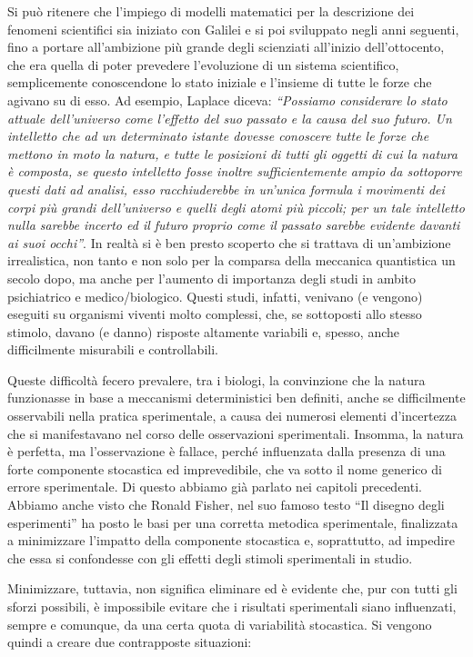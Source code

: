 \documentclass[
  12pt,
]{book}
\begin{document}
Si può ritenere che l'impiego di modelli matematici per la descrizione dei fenomeni scientifici sia iniziato con Galilei e si poi sviluppato negli anni seguenti, fino a portare all'ambizione più grande degli scienziati all'inizio dell'ottocento, che era quella di poter prevedere l'evoluzione di un sistema scientifico, semplicemente conoscendone lo stato iniziale e l'insieme di tutte le forze che agivano su di esso. Ad esempio, Laplace diceva: \emph{``Possiamo considerare lo stato attuale dell'universo come l'effetto del suo passato e la causa del suo futuro. Un intelletto che ad un determinato istante dovesse conoscere tutte le forze che mettono in moto la natura, e tutte le posizioni di tutti gli oggetti di cui la natura è composta, se questo intelletto fosse inoltre sufficientemente ampio da sottoporre questi dati ad analisi, esso racchiuderebbe in un'unica formula i movimenti dei corpi più grandi dell'universo e quelli degli atomi più piccoli; per un tale intelletto nulla sarebbe incerto ed il futuro proprio come il passato sarebbe evidente davanti ai suoi occhi''}. In realtà si è ben presto scoperto che si trattava di un'ambizione irrealistica, non tanto e non solo per la comparsa della meccanica quantistica un secolo dopo, ma anche per l'aumento di importanza degli studi in ambito psichiatrico e medico/biologico. Questi studi, infatti, venivano (e vengono) eseguiti su organismi viventi molto complessi, che, se sottoposti allo stesso stimolo, davano (e danno) risposte altamente variabili e, spesso, anche difficilmente misurabili e controllabili.

Queste difficoltà fecero prevalere, tra i biologi, la convinzione che la natura funzionasse in base a meccanismi deterministici ben definiti, anche se difficilmente osservabili nella pratica sperimentale, a causa dei numerosi elementi d'incertezza che si manifestavano nel corso delle osservazioni sperimentali. Insomma, la natura è perfetta, ma l'osservazione è fallace, perché influenzata dalla presenza di una forte componente stocastica ed imprevedibile, che va sotto il nome generico di errore sperimentale. Di questo abbiamo già parlato nei capitoli precedenti. Abbiamo anche visto che Ronald Fisher, nel suo famoso testo ``Il disegno degli esperimenti'' ha posto le basi per una corretta metodica sperimentale, finalizzata a minimizzare l'impatto della componente stocastica e, soprattutto, ad impedire che essa si confondesse con gli effetti degli stimoli sperimentali in studio.

Minimizzare, tuttavia, non significa eliminare ed è evidente che, pur con tutti gli sforzi possibili, è impossibile evitare che i risultati sperimentali siano influenzati, sempre e comunque, da una certa quota di variabilità stocastica. Si vengono quindi a creare due contrapposte situazioni:
\end{document}
